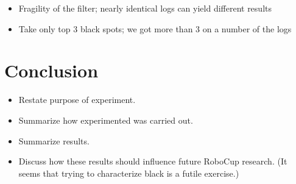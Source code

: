 \documentclass[11pt, twocolumn]{article}
\begin{document}
\begin{itemize}
\item Fragility of the filter; nearly identical logs can yield different results
\item Take only top 3 black spots; we got more than 3 on a number of the logs
\end{itemize}
\section{Conclusion}
\begin{itemize}
\item Restate purpose of experiment.
\item Summarize how experimented was carried out.
\item Summarize results.
\item Discuss how these results should influence future RoboCup research. (It seems that trying to characterize black is a futile exercise.)
\end{itemize}
\end{document}
